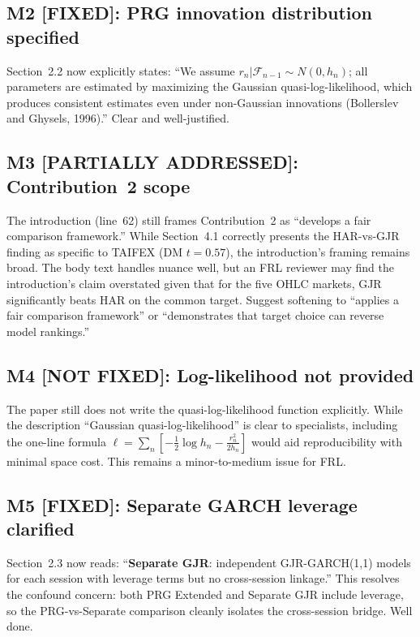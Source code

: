 \documentclass[12pt,a4paper]{article}
\begin{document}
\subsection*{\textcolor{okgreen}{M2 [FIXED]: PRG innovation distribution specified}}

Section~2.2 now explicitly states: ``We assume $r_n | \mathcal{F}_{n-1} \sim N(0, h_n)$; all parameters are estimated by maximizing the Gaussian quasi-log-likelihood, which produces consistent estimates even under non-Gaussian innovations (Bollerslev and Ghysels, 1996).'' \textcolor{okgreen}{Clear and well-justified.}

\subsection*{\textcolor{warncolor}{M3 [PARTIALLY ADDRESSED]: Contribution~2 scope}}

The introduction (line~62) still frames Contribution~2 as ``develops a fair comparison framework.'' While Section~4.1 correctly presents the HAR-vs-GJR finding as specific to TAIFEX (DM $t = 0.57$), the introduction's framing remains broad. The body text handles nuance well, but an FRL reviewer may find the introduction's claim overstated given that for the five OHLC markets, GJR significantly beats HAR on the common target. Suggest softening to ``applies a fair comparison framework'' or ``demonstrates that target choice can reverse model rankings.''

\subsection*{\textcolor{warncolor}{M4 [NOT FIXED]: Log-likelihood not provided}}

The paper still does not write the quasi-log-likelihood function explicitly. While the description ``Gaussian quasi-log-likelihood'' is clear to specialists, including the one-line formula $\ell = \sum_n [-\frac{1}{2}\log h_n - \frac{r_n^2}{2h_n}]$ would aid reproducibility with minimal space cost. This remains a minor-to-medium issue for FRL.

\subsection*{\textcolor{okgreen}{M5 [FIXED]: Separate GARCH leverage clarified}}

Section~2.3 now reads: ``\textbf{Separate GJR}: independent GJR-GARCH(1,1) models for each session with leverage terms but no cross-session linkage.'' This resolves the confound concern: both PRG Extended and Separate GJR include leverage, so the PRG-vs-Separate comparison cleanly isolates the cross-session bridge. \textcolor{okgreen}{Well done.}
\end{document}
